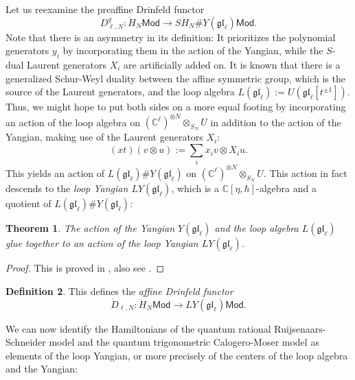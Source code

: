 \documentclass[11pt]{report}
\newtheorem{theorem}{Theorem}[section]
\theoremstyle{definition}
\newtheorem{definition}[theorem]{Definition}
\theoremstyle{remark}
\theoremstyle{remark}
\newcommand{\C}{\mathbb{C}}
\begin{document}
Let us reexamine the preaffine Drinfeld functor
\begin{equation*}
D_{\ell,N}^g: \ddot H_N\mathsf{Mod} \to S\ddot H_N \# Y(\mathfrak{gl}_\ell) \mathsf{Mod}.
\end{equation*}
Note that there is an asymmetry in its definition: It prioritizes the polynomial generators $y_i$ by incorporating them in the action of the Yangian, while the $S$-dual Laurent generators $X_i$ are artificially added on. It is known that there is a generalized Schur-Weyl duality between the affine symmetric group, which is the source of the Laurent generators, and the loop algebra $L(\mathfrak{gl}_\ell) := U(\mathfrak{gl}_\ell[t^{\pm 1}])$. Thus, we might hope to put both sides on a more equal footing by incorporating an action of the loop algebra on $(\C^\ell)^{\otimes N} \otimes_{S_N} U$ in addition to the action of the Yangian, making use of the Laurent generators $X_i$:
\begin{equation*}
(x t)(v \otimes u) := \sum_i x_i v \otimes X_i u.
\end{equation*}
This yields an action of $L(\mathfrak{gl}_\ell) \# Y(\mathfrak{gl}_\ell)$ on $(\C^\ell)^{\otimes N} \otimes_{S_N} U$. This action in fact descends to the \emph{loop Yangian $LY(\mathfrak{gl}_\ell)$}, which is a $\C[\eta,\hbar]$-algebra and a quotient of $L(\mathfrak{gl}_\ell) \# Y(\mathfrak{gl}_\ell)$:

\begin{theorem}
The action of the Yangian $Y(\mathfrak{gl}_\ell)$ and the loop algebra $L(\mathfrak{gl}_\ell)$ glue together to an action of the loop Yangian $LY(\mathfrak{gl}_\ell)$.
\end{theorem}

\begin{proof}
This is proved in \cite{article:guay:2005}, also see \cite{article:kodera:2016}.
\end{proof}

\begin{definition}
This defines the \emph{affine Drinfeld functor}
\begin{equation*}
\dot D_{\ell,N}: \ddot H_N\mathsf{Mod} \to LY(\mathfrak{gl}_\ell) \mathsf{Mod}.
\end{equation*}
\end{definition}

We can now identify the Hamiltonians of the quantum rational Ruijsenaars-Schneider model and the quantum trigonometric Calogero-Moser model as elements of the loop Yangian, or more precisely of the centers of the loop algebra and the Yangian:
\end{document}
